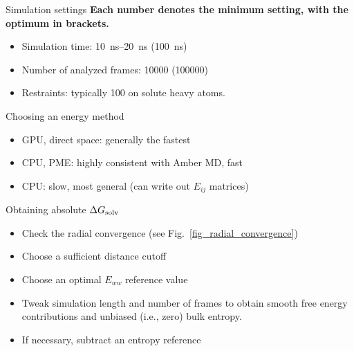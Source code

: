 \documentclass[9pt,tutorial]{livecoms}
\begin{document}
\begin{Checklists}[h]

\begin{checklist}{Simulation settings}
\textbf{Each number denotes the minimum setting, with the optimum in brackets.}
\begin{itemize}
	\item Simulation time: \SIrange{10}{20}{\nano\second} (\SI{100}{\nano\second})
	\item Number of analyzed frames: \num{10000} (\num{100000})
	\item Restraints: typically \SI{100}{\kcalPerMolASqr} on solute heavy atoms.
\end{itemize}
\end{checklist}

\begin{checklist}{Choosing an energy method}
\begin{itemize}
	\item GPU, direct space: generally the fastest
	\item CPU, PME: highly consistent with Amber MD, fast
	\item CPU: slow, most general (can write out $E_{ij}$ matrices)
\end{itemize}
\end{checklist}

\begin{checklist}{Obtaining absolute $\Delta G_\textup{solv}$}
\begin{itemize}
	\item Check the radial convergence (see Fig.~\ref{fig_radial_convergence})
	\item Choose a sufficient distance cutoff
	\item Choose an optimal $E_{ww}$ reference value
	\item Tweak simulation length and number of frames to obtain smooth free energy contributions and unbiased (i.e., zero) bulk entropy.
	\item If necessary, subtract an entropy reference
\end{itemize}
\end{checklist}


\end{Checklists}
\end{document}
